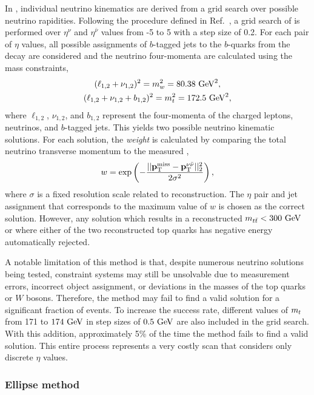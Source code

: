In \vweight, individual neutrino kinematics are derived from a grid search over possible neutrino rapidities.
Following the procedure defined in Ref.~\cite{ATLAS:2019zrq}, a grid search of is performed over $\eta^\nu$ and $\eta^{\bar\nu}$ values from -5 to 5 with a step size of 0.2.
For each pair of $\eta$ values, all possible assignments of $b$-tagged jets to the $b$-quarks from the \ttbar decay are considered and the neutrino four-momenta are calculated using the mass constraints,
\begin{gather}
    \label{eq:mass_constraints}
    (\ell_{1, 2} + \nu_{1, 2})^2 = m_w^2 = 80.38~\GeV^2, \\
    (\ell_{1, 2} + \nu_{1, 2} + b_{1, 2})^2 = m_t^2 = 172.5~\GeV^2,
\end{gather}
where $\ell_{1, 2}$, $\nu_{1, 2}$, and $b_{1, 2}$ represent the four-momenta of the charged leptons, neutrinos, and $b$-tagged jets.
This yields two possible neutrino kinematic solutions.
For each solution, the \textit{weight} is calculated by comparing the total neutrino transverse momentum \ptvv to the measured \ptmiss,
\begin{equation}
    \label{eq:neutrino_weight}
    w = \exp \left( - \frac{||\mathbf{p}_\mathrm{T}^{\mathrm{miss}} - \mathbf{p}_\mathrm{T}^{\nu\bar\nu}||_2^2}{2 \sigma^2} \right),
\end{equation}
where $\sigma$ is a fixed resolution scale related to \ptmiss reconstruction.
The $\eta$ pair and jet assignment that corresponds to the maximum value of $w$ is chosen as the correct solution.
However, any solution which results in a reconstructed $\mttbar < 300~\GeV$ or where either of the two reconstructed top quarks has negative energy automatically rejected.

A notable limitation of this method is that, despite numerous neutrino solutions being tested, constraint systems may still be unsolvable due to measurement errors, incorrect object assignment, or deviations in the masses of the top quarks or
$W$ bosons.
Therefore, the method may fail to find a valid solution for a significant fraction of events.
To increase the success rate, different values of $m_t$ from 171 to $174~\GeV$ in step sizes of $0.5~\GeV$ are also included in the grid search.
With this addition, approximately 5\% of the time the \vweight method fails to find a valid solution.
This entire process represents a very costly scan that considers only discrete $\eta$ values.

\subsubsection{Ellipse method}

